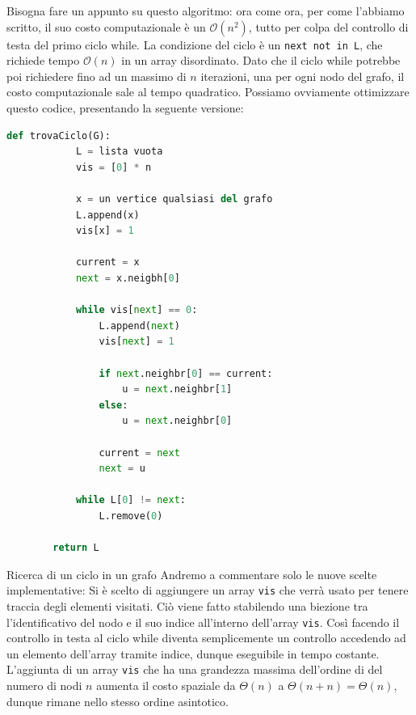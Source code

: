 \documentclass[12pt]{report}
\begin{document}
	Bisogna fare un appunto su questo algoritmo: ora come ora, per come l'abbiamo scritto, il suo costo computazionale è un $\mathcal{O}(n^2)$, tutto per colpa del controllo di testa del primo ciclo while. La condizione del ciclo è un \texttt{next not in L}, che richiede tempo $\mathcal{O}(n)$ in un array disordinato. Dato che il ciclo while potrebbe poi richiedere fino ad un massimo di $n$ iterazioni, una per ogni nodo del grafo, il costo computazionale sale al tempo quadratico.
	Possiamo ovviamente ottimizzare questo codice, presentando la seguente versione:
	\begin{lstlisting}[language=Python, caption={Ricerca di un ciclo in un grafo ottimizzata}]
		def trovaCiclo(G):
			L = lista vuota
			vis = [0] * n
			
			x = un vertice qualsiasi del grafo
			L.append(x)
			vis[x] = 1
			
			current = x
			next = x.neigbh[0]
			
			while vis[next] == 0:
				L.append(next)
				vis[next] = 1
				
				if next.neighbr[0] == current:
					u = next.neighbr[1]
				else:
					u = next.neighbr[0]
				
				current = next
				next = u
			
			while L[0] != next:
				L.remove(0)
		
		return L
	\end{lstlisting}
	
	\begin{algoritmo}{Ricerca di un ciclo in un grafo}{}
		Andremo a commentare solo le nuove scelte implementative:
		Si è scelto di aggiungere un array \texttt{vis} che verrà usato per tenere traccia degli elementi visitati. Ciò viene fatto stabilendo una biezione tra l'identificativo del nodo e il suo indice all'interno dell'array \texttt{vis}. Così facendo il controllo in testa al ciclo while diventa semplicemente un controllo accedendo ad un elemento dell'array tramite indice, dunque eseguibile in tempo costante.
		L'aggiunta di un array \texttt{vis} che ha una grandezza massima dell'ordine di del numero di nodi $n$ aumenta il costo spaziale da $\Theta(n)$ a $\Theta(n + n) = \Theta(n)$, dunque rimane nello stesso ordine asintotico.
	\end{algoritmo}
	
\end{document}

